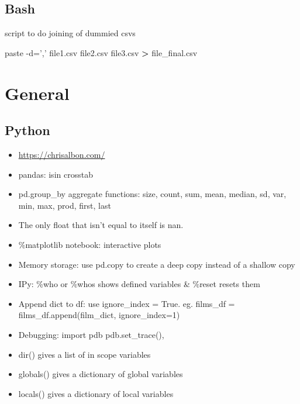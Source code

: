 \documentclass[]{book}
\newenvironment{Shaded}{\begin{snugshade}}{\end{snugshade}}
\newcommand{\StringTok}[1]{\textcolor[rgb]{0.31,0.60,0.02}{#1}}
\newcommand{\OperatorTok}[1]{\textcolor[rgb]{0.81,0.36,0.00}{\textbf{#1}}}
\newcommand{\ExtensionTok}[1]{#1}
\newcommand{\NormalTok}[1]{#1}
\theoremstyle{definition}
\theoremstyle{definition}
\theoremstyle{definition}
\theoremstyle{remark}
\begin{document}
\section{Bash}\label{bash}

script to do joining of dummied csvs

\begin{Shaded}
\begin{Highlighting}[]
\ExtensionTok{paste}\NormalTok{ -d=}\StringTok{','}\NormalTok{ file1.csv file2.csv file3.csv }\OperatorTok{>}\NormalTok{ file_final.csv}
\end{Highlighting}
\end{Shaded}

\chapter*{General}\label{general-2}

\section{Python}\label{python-1}

\begin{itemize}
\item
  \url{https://chrisalbon.com/}
\item
  pandas: isin \textbar{} crosstab
\item
  pd.group\_by aggregate functions: size, count, sum, mean, median, sd,
  var, min, max, prod, first, last
\item
  The only float that isn't equal to itself is nan.
\item
  \%matplotlib notebook: interactive plots
\item
  Memory storage: use pd.copy to create a deep copy instead of a shallow
  copy
\item
  IPy: \%who or \%whos shows defined variables \& \%reset resets them
\item
  Append dict to df: use ignore\_index = True. eg. films\_df =
  films\_df.append(film\_dict, ignore\_index=1)
\item
  Debugging: import pdb \textbar{} pdb.set\_trace(),
\item
  dir() gives a list of in scope variables
\item
  globals() gives a dictionary of global variables
\item
  locals() gives a dictionary of local variables
\end{itemize}
\end{document}
